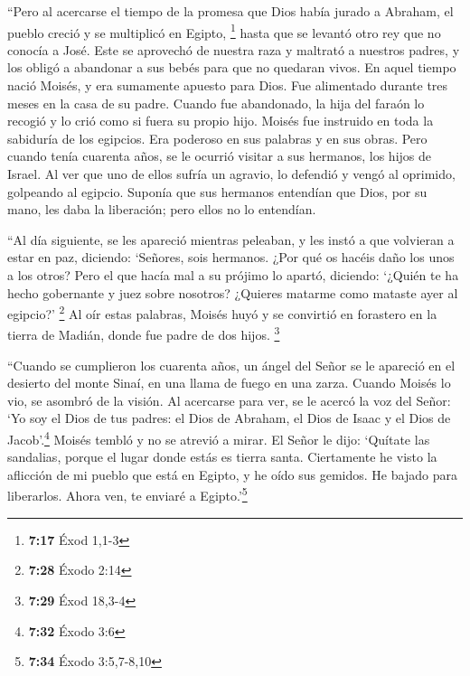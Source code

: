 \begin{paracol}{2}
 ``Pero al acercarse el tiempo de la promesa que Dios
había jurado a Abraham, el pueblo creció y se multiplicó en Egipto,
\footnote{\textbf{7:17} Éxod 1,1-3}  hasta que se levantó
otro rey que no conocía a José.  Este se aprovechó de
nuestra raza y maltrató a nuestros padres, y los obligó a abandonar a
sus bebés para que no quedaran vivos.  En aquel tiempo
nació Moisés, y era sumamente apuesto para Dios. Fue alimentado durante
tres meses en la casa de su padre.  Cuando fue
abandonado, la hija del faraón lo recogió y lo crió como si fuera su
propio hijo.  Moisés fue instruido en toda la sabiduría
de los egipcios. Era poderoso en sus palabras y en sus obras.
 Pero cuando tenía cuarenta años, se le ocurrió visitar a
sus hermanos, los hijos de Israel.  Al ver que uno de
ellos sufría un agravio, lo defendió y vengó al oprimido, golpeando al
egipcio.  Suponía que sus hermanos entendían que Dios,
por su mano, les daba la liberación; pero ellos no lo entendían.

 ``Al día siguiente, se les apareció mientras peleaban, y
les instó a que volvieran a estar en paz, diciendo: `Señores, sois
hermanos. ¿Por qué os hacéis daño los unos a los otros? 
Pero el que hacía mal a su prójimo lo apartó, diciendo: `¿Quién te ha
hecho gobernante y juez sobre nosotros?  ¿Quieres matarme
como mataste ayer al egipcio?' \footnote{\textbf{7:28} Éxodo 2:14}
 Al oír estas palabras, Moisés huyó y se convirtió en
forastero en la tierra de Madián, donde fue padre de dos hijos.
\footnote{\textbf{7:29} Éxod 18,3-4}

 ``Cuando se cumplieron los cuarenta años, un ángel del
Señor se le apareció en el desierto del monte Sinaí, en una llama de
fuego en una zarza.  Cuando Moisés lo vio, se asombró de
la visión. Al acercarse para ver, se le acercó la voz del Señor:
 `Yo soy el Dios de tus padres: el Dios de Abraham, el
Dios de Isaac y el Dios de Jacob'.\footnote{\textbf{7:32} Éxodo 3:6}
Moisés tembló y no se atrevió a mirar.  El Señor le dijo:
`Quítate las sandalias, porque el lugar donde estás es tierra santa.
 Ciertamente he visto la aflicción de mi pueblo que está
en Egipto, y he oído sus gemidos. He bajado para liberarlos. Ahora ven,
te enviaré a Egipto.'\footnote{\textbf{7:34} Éxodo 3:5,7-8,10}


\end{paracol}
